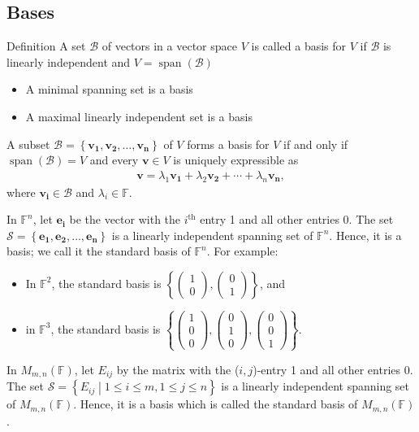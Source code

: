 \documentclass{report}
\renewcommand{\vec}{\mathbf}
\newcommand{\Span}{\operatorname{span}}
\newcommand{\cvec}[1]{ \begin{pmatrix} #1 \end{pmatrix} }
\begin{document}
\begin{enumerate}
	\section{Bases}
		\begin{question}{Definition}
			A set $\mathcal{B}$ of vectors in a vector space $V$ is called a basis for $V$ if $\mathcal{B}$ is linearly independent and $V = \Span(\mathcal{B})$

			\begin{itemize}
				\item A minimal spanning set is a basis
				\item A maximal linearly independent set is a basis
			\end{itemize}

			A subset $\mathcal{B} = \left\{\vec{v_1}, \vec{v_2}, \dots, \vec{v_n}\right\}$ of $V$ forms a basis for $V$ if and only if $\Span(\mathcal{B}) = V$ and every $\vec{v} \in V$ is uniquely expressible as 
			\begin{align*}
				\vec{v} = \lambda_1 \vec{v_1} + \lambda_2 \vec{v_2} + \cdots + \lambda_n \vec{v_n},
			\end{align*}
			where $\vec{v_i} \in \mathcal{B}$ and $\lambda_i \in \mathbb{F}$.
		\end{question}

		In $\mathbb{F}^n$, let $\vec{e_i}$ be the vector with the $i^{\text{th}}$ entry 1 and all other entries 0. The set $\mathcal{S} = \left\{ \vec{e_1}, \vec{e_2}, \dots, \vec{e_n} \right\}$ is a linearly independent spanning set of $\mathbb{F}^n$. Hence, it is a basis; we call it the standard basis of $\mathbb{F}^n$. For example:
			\begin{itemize}
				\item In $\mathbb{F}^2$, the standard basis is $\left\{\cvec{1\\0},\cvec{0\\1} \right\}$, and
				\item in $\mathbb{F}^3$, the standard basis is $\left\{\cvec{1\\0\\0},\cvec{0\\1\\0}, \cvec{0\\0\\1} \right\}$.
			\end{itemize}

		In $M_{m,n}(\mathbb{F})$, let $E_{ij}$ by the matrix with the ($i,j$)-entry 1 and all other entries 0. The set $\mathcal{S} = \left\{ E_{ij} \middle| 1 \leq i \leq m, 1 \leq j \leq n \right\}$ is a linearly independent spanning set of $M_{m,n}(\mathbb{F})$. Hence, it is a basis which is called the standard basis of $M_{m,n}(\mathbb{F})$.


\end{enumerate}
\end{document}
